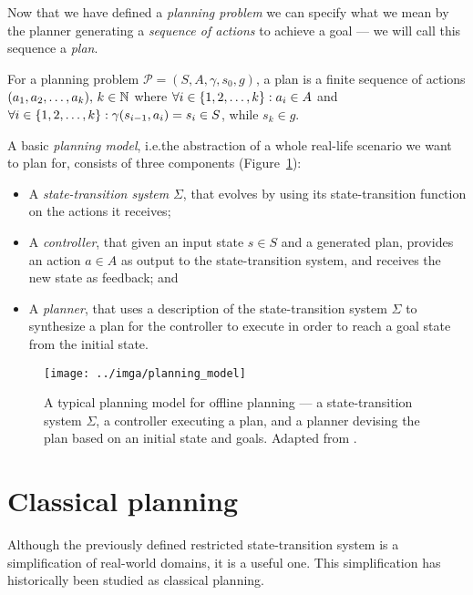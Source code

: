 Now that we have defined a \textit{planning problem} we can specify what we mean
by the planner generating a \textit{sequence of actions} to achieve a goal --- we will
call this sequence a \textit{plan}.

\begin{defn}[Plan]\label{defn:plan}\citep[Section~1.5]{Ghallab2004}
For a planning problem $\mathcal{P} = (S, A, \gamma, s_0, g)$,
a plan is a finite sequence of actions $(a_1, a_2, \ldots, a_k),\, k \in \mathbb{N}$ where
$\forall i \in \{1, 2, \ldots, k\} : a_i \in A$ and
$\forall i \in \{1, 2, \ldots, k\} : \gamma(s_{i-1}, a_i) = s_i \in S$, while $s_k \in g$.
\end{defn}

A basic \textit{planning model}, i.e.\;the abstraction of a whole real-life scenario
we want to plan for, consists of three components (Figure~\ref{fig:planning-model}):
\begin{itemize}
\item A \textit{state-transition system} $\Sigma$, that evolves by using its state-transition function on the actions
it receives;
\item A \textit{controller}, that given an input state $s \in S$ and a generated plan, provides an action $a \in A$ as output
to the state-transition system, and receives the new
state as feedback; and
\item A \textit{planner}, that uses a description of the state-transition system $\Sigma$ to synthesize a plan for the controller
to execute in order to reach a goal state from the initial state.
\end{itemize}

\begin{figure}[tb]
\begin{center}
\texttt{[image: ../imga/planning\_model]}
\end{center}
\caption[A typical planning model for offline planning.]{A typical planning model for offline planning --- a state-transition system $\Sigma$, a controller executing a plan, and a planner devising the plan based on an initial state and goals. Adapted from \citep[Figure~1.3]{Ghallab2004}.}
\label{fig:planning-model}
\end{figure}

\section{Classical planning}\label{classical-planning}

Although the previously defined restricted state-transition system is a simplification of real-world
domains, it is a useful one. 
This simplification has historically been studied as classical planning.

